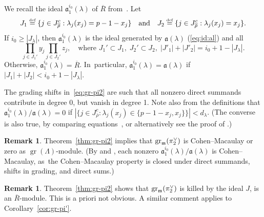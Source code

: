 \documentclass[JEP,XML,SOM,Unicode,NoFloatCountersInSection, NoEqCountersInSection,published]{cedram}
\newcommand{\quand}{\quad\text{and}\quad}
\let\ovl\overline
\newcommand{\defeq}{\stackrel{\textrm{\tiny{\upshape{def}}}}{=}}
\newcommand{\fa}{\mathfrak{a}}
\newcommand{\rhobar}{\overline{\rho}}
\DeclareMathOperator{\gr}{gr}
\theoremstyle{plain}
\theoremstyle{definition}
\newtheorem{rem}[prop]{Remark}
\begin{document}
We recall the ideal $\fa_1^{i_0}(\lambda)$ of $\ovl R$ from~\cite[(77)]{BHHMS4}.
Let
\[
J_1 \defeq \{ j \in J_{\rhobar}^c: \lambda_j(x_j) = p-1-x_j \}\quand J_2 \defeq \{ j \in J_{\rhobar}^c: \lambda_j(x_j) = x_j \}.
\]
If $i_0 \ge |J_\lambda|$, then $\fa_1^{i_0}(\lambda)$ is the ideal generated by $\fa(\lambda)$ (\cf \eqref{eq:id:al}) and all
\[
\prod_{j \in J_1'} y_j \prod_{j \in J_2'} z_j, \quad\text{where }J_1' \subset J_1,\; J_2' \subset J_2,\;|J'_1|+|J'_2| = i_0+1-|J_\lambda|.
\]
Otherwise, $\fa_1^{i_0}(\lambda) = \ovl R$. In~particular, $\mathfrak a_1^{i_0}(\lambda) = \mathfrak a(\lambda)$ if $|J_1|+|J_2| < i_0+1-|J_\lambda|$.

The grading shifts in~\eqref{eq:gr-pi2} are such that all nonzero direct summands contribute in degree 0, but vanish in degree 1.
Note also from the definitions that $\mathfrak{a}_1^{i_0}(\lambda)/\mathfrak{a}(\lambda) = 0$ if $|\{ j \in J_{\rhobar}^c: \lambda_j(x_j) \in \{ p-1-x_j, x_j \} \}| < d_\lambda$.
(The converse is also true, by comparing equations~\cite[(81) \& (82)]{BHHMS4}, or alternatively see the proof of \cite[Cor.\,4.4.7]{BHHMS4}.)

\begin{rem}\label{rem:gr-pi2-CM}
Theorem~\ref{thm:gr-pi2} implies that $\gr_\m(\pi_2^\vee)$ is Cohen--Macaulay or zero as $\gr(\Lambda)$-module.
(By \cite[Prop.\,4.4.3]{BHHMS4} and \cite[Cor.\,4.4.5]{BHHMS4}, each nonzero $\mathfrak{a}_1^{i_0}(\lambda)/\mathfrak{a}(\lambda)$ is Cohen--Macaulay, as~the Cohen--Macaulay property is closed under direct summands, shifts in grading, and direct sums.)
\end{rem}

\begin{rem}\label{rem:killed-by-J}
{Theorem~\ref{thm:gr-pi2} shows that $\gr_\m(\pi_2^\vee)$ is killed by the ideal $J$, \ie is an $\ovl R$-module.
This is a priori not obvious.
A similar comment applies to Corollary~\ref{cor:gr-pi'}.}
\end{rem}
\end{document}

